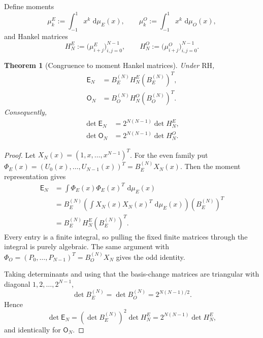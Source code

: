 \documentclass[preprint,12pt]{elsarticle}
\numberwithin{equation}{section}
\theoremstyle{plain}
\newtheorem{theorem}{Theorem}[section]
\theoremstyle{definition}
\theoremstyle{remark}
\newcommand{\RH}{\mathrm{RH}}
\newcommand{\E}{\mathsf E}
\newcommand{\Omat}{\mathsf O}
\newcommand{\dd}{\,\mathrm d}
\begin{document}
Define moments
\begin{equation}
\mu_k^E:=\int_{-1}^{1}x^k\,\dd\mu_E(x),
\qquad
\mu_k^O:=\int_{-1}^{1}x^k\,\dd\mu_O(x),
\label{eq:moment_sequences}
\end{equation}
and Hankel matrices
\begin{equation}
H_N^E:=\bigl(\mu_{i+j}^E\bigr)_{i,j=0}^{N-1},
\qquad
H_N^O:=\bigl(\mu_{i+j}^O\bigr)_{i,j=0}^{N-1}.
\label{eq:hidden_hankel_matrices}
\end{equation}

\begin{theorem}[Congruence to moment Hankel matrices]
\label{thm:hankel_congruence}
Under $\RH$,
\begin{align}
\E_N&=B_E^{(N)}H_N^E(B_E^{(N)})^T,
\label{eq:E_hankel_congruence}\\
\Omat_N&=B_O^{(N)}H_N^O(B_O^{(N)})^T.
\label{eq:O_hankel_congruence}
\end{align}
Consequently,
\begin{align}
\det\E_N&=2^{N(N-1)}\det H_N^E,
\label{eq:E_hankel_det_relation}\\
\det\Omat_N&=2^{N(N-1)}\det H_N^O.
\label{eq:O_hankel_det_relation}
\end{align}
\end{theorem}

\begin{proof}
Let $X_N(x)=(1,x,\ldots,x^{N-1})^T$.  For the even family put
$\Phi_E(x)=(U_0(x),\ldots,U_{N-1}(x))^T=B_E^{(N)}X_N(x)$.  Then the moment representation gives
\begin{align}
\E_N
&=\int \Phi_E(x)\Phi_E(x)^T\,\dd\mu_E(x)\\
&=B_E^{(N)}\left(\int X_N(x)X_N(x)^T\,\dd\mu_E(x)\right)(B_E^{(N)})^T\\
&=B_E^{(N)}H_N^E(B_E^{(N)})^T.
\end{align}
Every entry is a finite integral, so pulling the fixed finite matrices through the integral is purely algebraic.  The same argument with
$\Phi_O=(P_0,\ldots,P_{N-1})^T=B_O^{(N)}X_N$ gives the odd identity.

Taking determinants and using that the basis-change matrices are triangular with diagonal $1,2,\ldots,2^{N-1}$,
\begin{equation}
\det B_E^{(N)}=\det B_O^{(N)}=2^{N(N-1)/2}.
\end{equation}
Hence
\begin{equation}
\det\E_N=(\det B_E^{(N)})^2\det H_N^E
=2^{N(N-1)}\det H_N^E,
\end{equation}
and identically for $\Omat_N$.
\end{proof}
\end{document}
